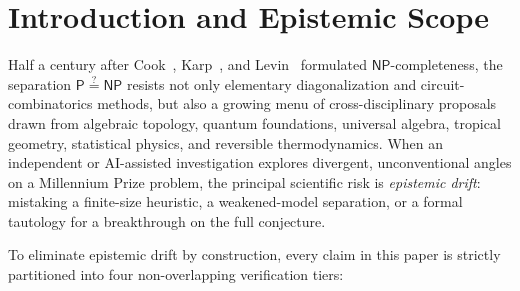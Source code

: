 \documentclass[11pt,reqno]{amsart}
\theoremstyle{definition}
\newcommand{\PP}{\mathsf{P}}
\newcommand{\NP}{\mathsf{NP}}
\begin{document}
\section{Introduction and Epistemic Scope}
\label{sec:intro}

Half a century after Cook~\cite{Cook1971}, Karp~\cite{Karp1972}, and Levin~\cite{Levin1973}
formulated $\NP$-completeness, the separation $\PP \stackrel{?}{=} \NP$ resists not only
elementary diagonalization and circuit-combinatorics methods, but also a growing menu of
cross-disciplinary proposals drawn from algebraic topology, quantum foundations, universal
algebra, tropical geometry, statistical physics, and reversible thermodynamics. When an
independent or AI-assisted investigation explores divergent, unconventional angles on a
Millennium Prize problem, the principal scientific risk is \emph{epistemic drift}:
mistaking a finite-size heuristic, a weakened-model separation, or a formal tautology for
a breakthrough on the full conjecture.

To eliminate epistemic drift by construction, every claim in this paper is strictly
partitioned into four non-overlapping verification tiers:
\end{document}
